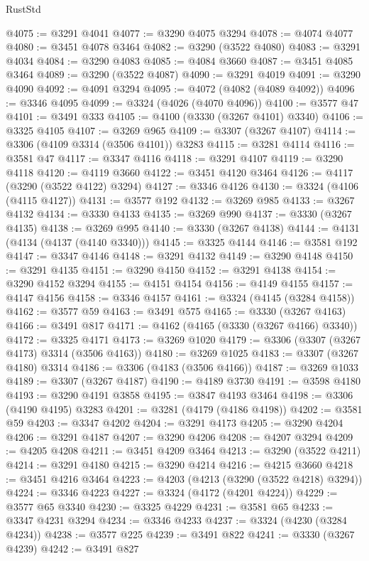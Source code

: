 \begin{lexlean}{RustStd}
\begin{coremodule}
@4075 := @3291 @4041
@4077 := @3290 @4075 @3294
@4078 := @4074 @4077
@4080 := @3451 @4078 @3464
@4082 := @3290 (@3522 @4080)
@4083 := @3291 @4034
@4084 := @3290 @4083
@4085 := @4084 @3660
@4087 := @3451 @4085 @3464
@4089 := @3290 (@3522 @4087)
@4090 := @3291 @4019
@4091 := @3290 @4090
@4092 := @4091 @3294
@4095 := @4072 (@4082 (@4089 @4092))
@4096 := @3346 @4095
@4099 := @3324 (@4026 (@4070 @4096))
@4100 := @3577 @47
@4101 := @3491 @333
@4105 := @4100 (@3330 (@3267 @4101) @3340)
@4106 := @3325 @4105
@4107 := @3269 @965
@4109 := @3307 (@3267 @4107)
@4114 := @3306 (@4109 @3314 (@3506 @4101)) @3283
@4115 := @3281 @4114
@4116 := @3581 @47
@4117 := @3347 @4116
@4118 := @3291 @4107
@4119 := @3290 @4118
@4120 := @4119 @3660
@4122 := @3451 @4120 @3464
@4126 := @4117 (@3290 (@3522 @4122) @3294)
@4127 := @3346 @4126
@4130 := @3324 (@4106 (@4115 @4127))
@4131 := @3577 @192
@4132 := @3269 @985
@4133 := @3267 @4132
@4134 := @3330 @4133
@4135 := @3269 @990
@4137 := @3330 (@3267 @4135)
@4138 := @3269 @995
@4140 := @3330 (@3267 @4138)
@4144 := @4131 (@4134 (@4137 (@4140 @3340)))
@4145 := @3325 @4144
@4146 := @3581 @192
@4147 := @3347 @4146
@4148 := @3291 @4132
@4149 := @3290 @4148
@4150 := @3291 @4135
@4151 := @3290 @4150
@4152 := @3291 @4138
@4154 := @3290 @4152 @3294
@4155 := @4151 @4154
@4156 := @4149 @4155
@4157 := @4147 @4156
@4158 := @3346 @4157
@4161 := @3324 (@4145 (@3284 @4158))
@4162 := @3577 @59
@4163 := @3491 @575
@4165 := @3330 (@3267 @4163)
@4166 := @3491 @817
@4171 := @4162 (@4165 (@3330 (@3267 @4166) @3340))
@4172 := @3325 @4171
@4173 := @3269 @1020
@4179 := @3306 (@3307 (@3267 @4173) @3314 (@3506 @4163))
@4180 := @3269 @1025
@4183 := @3307 (@3267 @4180) @3314
@4186 := @3306 (@4183 (@3506 @4166))
@4187 := @3269 @1033
@4189 := @3307 (@3267 @4187)
@4190 := @4189 @3730
@4191 := @3598 @4180
@4193 := @3290 @4191 @3858
@4195 := @3847 @4193 @3464
@4198 := @3306 (@4190 @4195) @3283
@4201 := @3281 (@4179 (@4186 @4198))
@4202 := @3581 @59
@4203 := @3347 @4202
@4204 := @3291 @4173
@4205 := @3290 @4204
@4206 := @3291 @4187
@4207 := @3290 @4206
@4208 := @4207 @3294
@4209 := @4205 @4208
@4211 := @3451 @4209 @3464
@4213 := @3290 (@3522 @4211)
@4214 := @3291 @4180
@4215 := @3290 @4214
@4216 := @4215 @3660
@4218 := @3451 @4216 @3464
@4223 := @4203 (@4213 (@3290 (@3522 @4218) @3294))
@4224 := @3346 @4223
@4227 := @3324 (@4172 (@4201 @4224))
@4229 := @3577 @65 @3340
@4230 := @3325 @4229
@4231 := @3581 @65
@4233 := @3347 @4231 @3294
@4234 := @3346 @4233
@4237 := @3324 (@4230 (@3284 @4234))
@4238 := @3577 @225
@4239 := @3491 @822
@4241 := @3330 (@3267 @4239)
@4242 := @3491 @827

\end{coremodule}
\end{lexlean}

